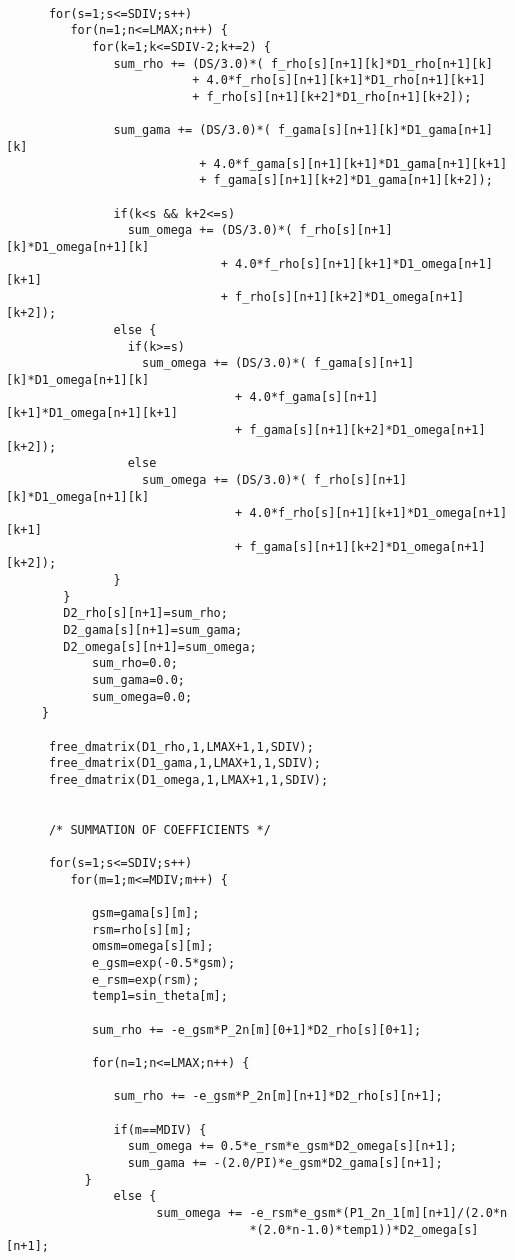 \begin{verbatim}
 
      for(s=1;s<=SDIV;s++)
         for(n=1;n<=LMAX;n++) {
            for(k=1;k<=SDIV-2;k+=2) { 
               sum_rho += (DS/3.0)*( f_rho[s][n+1][k]*D1_rho[n+1][k] 
                          + 4.0*f_rho[s][n+1][k+1]*D1_rho[n+1][k+1]
                          + f_rho[s][n+1][k+2]*D1_rho[n+1][k+2]);
 
               sum_gama += (DS/3.0)*( f_gama[s][n+1][k]*D1_gama[n+1][k] 
                           + 4.0*f_gama[s][n+1][k+1]*D1_gama[n+1][k+1]
                           + f_gama[s][n+1][k+2]*D1_gama[n+1][k+2]);
     
               if(k<s && k+2<=s) 
                 sum_omega += (DS/3.0)*( f_rho[s][n+1][k]*D1_omega[n+1][k] 
                              + 4.0*f_rho[s][n+1][k+1]*D1_omega[n+1][k+1]
                              + f_rho[s][n+1][k+2]*D1_omega[n+1][k+2]);
               else {
                 if(k>=s) 
                   sum_omega += (DS/3.0)*( f_gama[s][n+1][k]*D1_omega[n+1][k] 
                                + 4.0*f_gama[s][n+1][k+1]*D1_omega[n+1][k+1]
                                + f_gama[s][n+1][k+2]*D1_omega[n+1][k+2]);
                 else
                   sum_omega += (DS/3.0)*( f_rho[s][n+1][k]*D1_omega[n+1][k] 
                                + 4.0*f_rho[s][n+1][k+1]*D1_omega[n+1][k+1]
                                + f_gama[s][n+1][k+2]*D1_omega[n+1][k+2]);
               }
	    }
	    D2_rho[s][n+1]=sum_rho;
	    D2_gama[s][n+1]=sum_gama;
	    D2_omega[s][n+1]=sum_omega;
            sum_rho=0.0;
            sum_gama=0.0;
            sum_omega=0.0;
	 }
 
      free_dmatrix(D1_rho,1,LMAX+1,1,SDIV);
      free_dmatrix(D1_gama,1,LMAX+1,1,SDIV);
      free_dmatrix(D1_omega,1,LMAX+1,1,SDIV);


      /* SUMMATION OF COEFFICIENTS */

      for(s=1;s<=SDIV;s++) 
         for(m=1;m<=MDIV;m++) {

            gsm=gama[s][m];
            rsm=rho[s][m];
            omsm=omega[s][m];             
            e_gsm=exp(-0.5*gsm);
            e_rsm=exp(rsm);
            temp1=sin_theta[m];

            sum_rho += -e_gsm*P_2n[m][0+1]*D2_rho[s][0+1]; 

            for(n=1;n<=LMAX;n++) {

               sum_rho += -e_gsm*P_2n[m][n+1]*D2_rho[s][n+1]; 

               if(m==MDIV) {             
                 sum_omega += 0.5*e_rsm*e_gsm*D2_omega[s][n+1]; 
                 sum_gama += -(2.0/PI)*e_gsm*D2_gama[s][n+1];   
	       }
               else { 
                     sum_omega += -e_rsm*e_gsm*(P1_2n_1[m][n+1]/(2.0*n
                                  *(2.0*n-1.0)*temp1))*D2_omega[s][n+1];
  

\end{verbatim}
